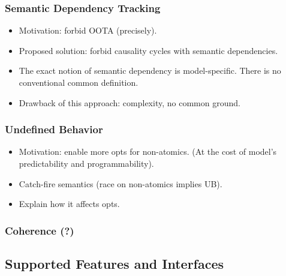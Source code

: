\subsubsection{Semantic Dependency Tracking}

\begin{itemize}
  \item Motivation: forbid OOTA (precisely).
  \item Proposed solution: forbid causality cycles with semantic dependencies. 
  \item The exact notion of semantic dependency is model-specific.
        There is no conventional common definition.
  \item Drawback of this approach: complexity, no common ground.
\end{itemize}

\subsubsection{Undefined Behavior}
\label{sec:background:ub}

\begin{itemize}
  \item Motivation: enable more opts for non-atomics.
        (At the cost of model's predictability and programmability).
  \item Catch-fire semantics (race on non-atomics implies UB).
  \item Explain how it affects opts.
\end{itemize}

\subsubsection{Coherence (?)}
\label{sec:background:coh}

\subsection{Supported Features and Interfaces}

